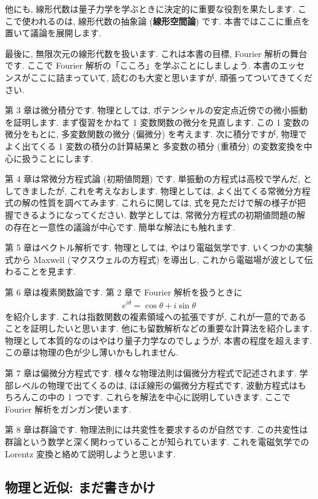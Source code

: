 \documentclass[openany, a4paper, oneside]{book}
\theoremstyle{break}
\theoremstyle{breakdefn}
\begin{document}
他にも, 線形代数は量子力学を学ぶときに決定的に重要な役割を果たします.
ここで使われるのは, 線形代数の抽象論 (\textbf{線形空間論}) です.
本書ではここに重点を置いて議論を展開します.

最後に, 無限次元の線形代数を扱います.
これは本書の目標, Fourier 解析の舞台です.
ここで Fourier 解析の「こころ」を学ぶことにしましょう.
本書のエッセンスがここに詰まっていて, 読むのも大変と思いますが,
頑張ってついてきてください.

第 3 章は微分積分です.
物理としては, ポテンシャルの安定点近傍での微小振動を証明します.
まず復習をかねて 1 変数関数の微分を見直します.
この 1 変数の微分をもとに, 多変数関数の微分 (偏微分) を考えます.
次に積分ですが, 物理でよく出てくる 1 変数の積分の計算結果と
多変数の積分 (重積分) の変数変換を中心に扱うことにします.

第 4 章は常微分方程式論 (初期値問題) です.
単振動の方程式は高校で学んだ, としてきましたが, これを考えなおします.
物理としては, よく出てくる常微分方程式の解の性質を調べてみます.
これらに関しては, 式を見ただけで解の様子が把握できるようになってください.
数学としては, 常微分方程式の初期値問題の解の存在と一意性の議論が中心です.
簡単な解法にも触れます.

第 5 章はベクトル解析です.
物理としては, やはり電磁気学です.
いくつかの実験式から Maxwell (マクスウェルの方程式) を導出し,
これから電磁場が波として伝わることを見ます.

第 6 章は複素関数論です.
第 2 章で Fourier 解析を扱うときに\textbf{}
    \begin{align}
        e^{i \theta}
        =
        \cos \theta + i \sin \theta
    \end{align}
を紹介します.
これは指数関数の複素領域への拡張ですが, これが一意的であることを証明したいと思います.
他にも留数解析などの重要な計算法を紹介します.
物理として本質的なのはやはり量子力学なのでしょうが, 本書の程度を超えます.
この章は物理の色が少し薄いかもしれません.

第 7 章は偏微分方程式です.
様々な物理法則は偏微分方程式で記述されます.
学部レベルの物理で出てくるのは, ほぼ線形の偏微分方程式です,
波動方程式はもちろんこの中の 1 つです.
これらを解法を中心に説明していきます.
ここで Fourier 解析をガンガン使います.

第 8 章は群論です.
物理法則には共変性を要求するのが自然です.
この共変性は群論という数学と深く関わっていることが知られています.
これを電磁気学での Lorentz 変換と絡めて説明しようと思います.
\subsection{物理と近似: まだ書きかけ}
\label{sec-4-3-1-6}
\end{document}
